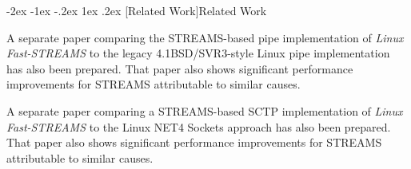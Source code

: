 \documentclass[letterpaper,final,notitlepage,twocolumn,10pt,twoside]{article}
\makeatletter
\renewcommand\section{\@startsection {section}{1}{\z@}%
                                   {-2ex \@plus -1ex \@minus -.2ex}%
                                   {1ex \@plus .2ex}%
                                   {\normalfont\large\bfseries}}
\makeatother
\begin{document}
\section[Related Work]{Related Work}

A separate paper comparing the STREAMS-based pipe implementation of \textsl{Linux Fast-STREAMS} to
the legacy 4.1BSD/SVR3-style Linux pipe implementation has also been prepared.  That paper also
shows significant performance improvements for STREAMS attributable to similar causes.

A separate paper comparing a STREAMS-based SCTP implementation of \textsl{Linux Fast-STREAMS} to the
Linux NET4 Sockets approach has also been prepared.  That paper also shows significant performance
improvements for STREAMS attributable to similar causes.

\FloatBarrier
{}

\end{document}

